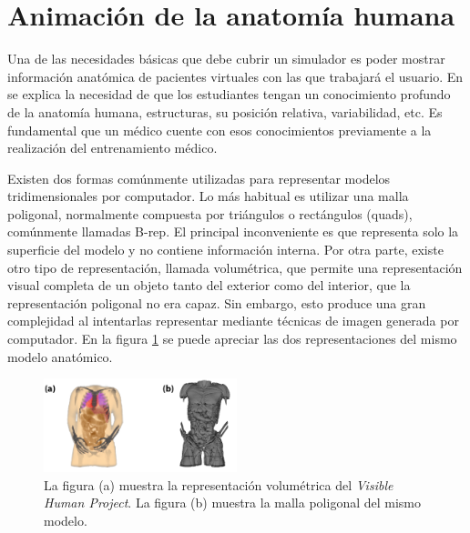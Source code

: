 \section{Animación de la anatomía humana} 
\label{art:anatomy}



Una de las necesidades básicas que debe cubrir un simulador es poder mostrar información anatómica de pacientes virtuales con las que trabajará el usuario. En  \cite{preim2018survey} se explica la necesidad de que los estudiantes tengan un conocimiento profundo de la anatomía humana, estructuras, su posición relativa, variabilidad, etc. Es fundamental que un médico cuente con esos conocimientos previamente a la realización del entrenamiento médico.

Existen dos formas comúnmente utilizadas para representar modelos tridimensionales por computador. Lo más habitual es utilizar una malla poligonal, normalmente compuesta por triángulos o rectángulos (quads), comúnmente llamadas \ac{B-rep}. El principal inconveniente es que representa solo la superficie del modelo y no contiene información interna.  %
Por otra parte, existe otro tipo de representación, llamada volumétrica, que permite una representación visual completa de un objeto tanto del exterior como del interior, que la representación poligonal no era capaz. Sin embargo, esto produce una gran complejidad al intentarlas representar mediante técnicas de imagen generada por computador.
En la figura \ref{fig:HVP} se puede apreciar las dos representaciones del mismo modelo anatómico.

\begin{figure}[h]
   \centering
    \includegraphics[width=0.5\textwidth]{IMG/volvsb-rep.png}
    \caption{La figura (a) muestra la representación volumétrica del \emph{Visible Human Project}\cite{ackerman1998visible}. La figura (b) muestra la malla poligonal del mismo modelo. }
   \label{fig:HVP}
\end{figure}



